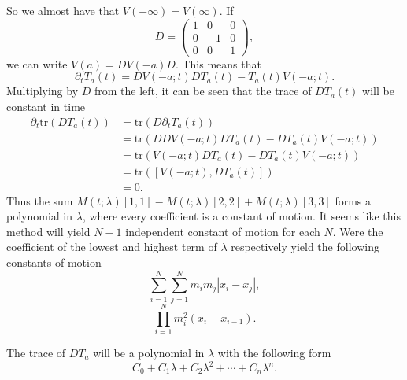 \documentclass[english,master]{liumaiex}
\theoremstyle{plain}
\theoremstyle{definition}
\newcommand{\tr}{\text{tr}}
\begin{document}
So we almost have that $V(-\infty) = V(\infty)$. If
\begin{equation}
	D = 
\begin{pmatrix}
	1 & 0 & 0 \\
	0 & -1 & 0 \\
	0 & 0 & 1
\end{pmatrix},
\end{equation}
%
we can write $V(a) = DV(-a)D$. This means that 
\begin{equation}
	\partial_t T_a(t) = DV(-a;t)DT_a(t) - T_a(t)V(-a;t).
\end{equation}
Multiplying by $D$ from the left, it can be seen that the trace of $DT_a(t)$ will be constant in time
\begin{equation}
\begin{aligned}
	\partial_t \tr(D T_a(t))
	&= \tr(D \partial_t T_a(t)) \\
	&= \tr(DDV(-a;t)DT_a(t) - DT_a(t)V(-a;t)) \\
	&= \tr(V(-a;t)DT_a(t) - DT_a(t)V(-a;t)) \\
	&= \tr([V(-a;t), DT_a(t)]) \\
	&= 0.
\end{aligned}
\end{equation}
Thus the sum $M(t;\lambda)[1,1] - M(t;\lambda)[2,2] + M(t;\lambda)[3,3]$ forms a polynomial in $\lambda$, where every coefficient is a constant of motion. It seems like this method will yield $N-1$ independent constant of motion for each $N$. Were the coefficient of the lowest and highest term of $\lambda$ respectively yield the following constants of motion
\begin{equation}
	\sum_{i=1}^{N}\sum_{j=1}^N m_i m_j |x_i - x_j|,
\end{equation}
\begin{equation}
	\prod_{i=1}^{N} m_i^2 (x_i - x_{i-1}).
\end{equation}

The trace of $DT_a$ will be a polynomial in $\lambda$ with the following form
\begin{equation}
	C_0 + C_1 \lambda + C_2 \lambda^2 + \cdots + C_{n} \lambda^{n}.
\end{equation}
\end{document}
